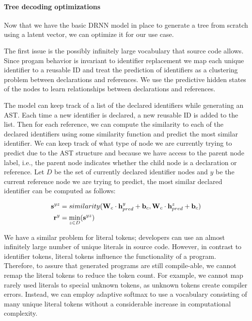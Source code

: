 \paragraph{Tree decoding optimizations} Now that we have the basic DRNN model \cite{alvarezmelis2017tree} in place to generate a tree from scratch using a latent vector, we can optimize it for our use case. 



The first issue is the possibly infinitely large vocabulary that source code allows. Since progam behavior is invariant to identifier replacement we map each unique identifier to a reusable ID \cite{tufano2019learning} and treat the prediction of identifiers as a clustering problem between declarations and references. We use the predictive hidden states of the nodes to learn relationships between declarations and references.  



The model can keep track of a list of the declared identifiers while generating an AST. Each time a new identifier is declared, a new reusable ID is added to the list. Then for each reference, we can compute the similarity to each of the declared identifiers using some similarity function and predict the most similar identifier. We can keep track of what type of node we are currently trying to predict due to the AST structure and because we have access to the parent node label, i.e., the parent node indicates whether the child node is a declaration or reference. Let $D$ be the set of currently declared identifier nodes and $y$ be the current reference node we are trying to predict, the most similar declared identifier can be computed as follows:

\begin{align}
    \mathbf{s}^{yz} &= similarity(\mathbf{W}_c \cdot \mathbf{h}^y_{pred} + \mathbf{b}_c,  \mathbf{W}_c \cdot \mathbf{h}^z_{pred} + \mathbf{b}_c) \\
    \mathbf{r}^y &= \min_{z \in D}(\mathbf{s}^{yz})
\end{align}



We have a similar problem for literal tokens; developers can use an almost infinitely large number of unique literals in source code. However, in contrast to identifier tokens, literal tokens influence the functionality of a program. Therefore, to assure that generated programs are still compile-able, we cannot remap the literal tokens to reduce the token count. For example, we cannot map rarely used literals to special unknown tokens, as unknown tokens create compiler errors. Instead, we can employ adaptive softmax \cite{grave2017efficient} to use a vocabulary consisting of many unique literal tokens without a considerable increase in computational complexity.



